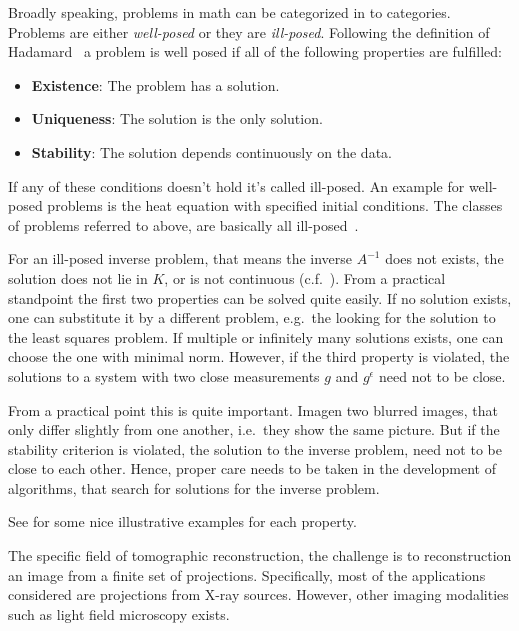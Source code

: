 Broadly speaking, problems in math can be categorized in to categories. Problems are either
\textit{well-posed} or they are \textit{ill-posed}. Following the definition of
Hadamard~\cite{hadamard_sur_1902} a problem is well posed if all of the following properties are
fulfilled:

\begin{itemize}
	\item \textbf{Existence}: The problem has a solution.
	\item \textbf{Uniqueness}: The solution is the only solution.
	\item \textbf{Stability}: The solution depends continuously on the data.
\end{itemize}

If any of these conditions doesn't hold it's called ill-posed. An example for well-posed problems is
the heat equation with specified initial conditions. The classes of problems referred to above, are
basically all ill-posed~\cite{hansen_discrete_2010}.

For an ill-posed inverse problem, that means the inverse \(A^{-1}\) does not exists, the solution
does not lie in \(K\), or is not continuous (c.f.~\cite[chap. 4]{natterer_mathematics_1986}). From a
practical standpoint the first two properties can be solved quite easily. If no solution exists, one
can substitute it by a different problem, e.g.\ the looking for the solution to the least squares
problem. If multiple or infinitely many solutions exists, one can choose the one with minimal norm.
However, if the third property is violated, the solutions to a system with two close measurements
\(g\) and \(g^\epsilon\) need not to be close.

From a practical point this is quite important. Imagen two blurred images, that only differ slightly
from one another, i.e.\ they show the same picture. But if the stability criterion is violated, the
solution to the inverse problem, need not to be close to each other. Hence, proper care needs to be
taken in the development of algorithms, that search for solutions for the inverse problem.

See \citeauthor{hansen_discrete_2010}\cite{hansen_discrete_2010} for some nice illustrative examples
for each property.

The specific field of tomographic reconstruction, the challenge is to reconstruction an image from a
finite set of projections. Specifically, most of the applications considered are projections from
X-ray sources. However, other imaging modalities such as light field microscopy exists.

